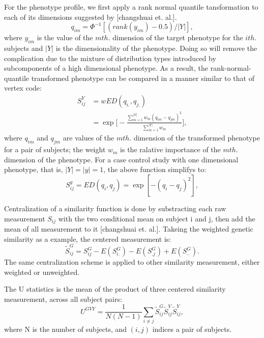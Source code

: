 \documentclass[twocolumn]{article}
\begin{document}
For the phenotype profile, we first apply a rank normal quantile tansformation to each of its dimensions suggested by [changshuai et. al.]. 
\begin{displaymath}
  q_{im}=\Phi^{-1}[(rank(y_{im})-0.5)/|Y|],
\end{displaymath} 
where $y_{im}$ is the value of the $m th.$ dimension of the target phenotype for the $i th.$ subjects and $|Y|$ is the dimensionality of the phenotype. Doing so will remove the complication due to the mixture of distribution types introduced by subcomponents of a high dimensional phenotype. As a result, the rank-normal-quantile transformed phenotype can be compared in a manner similar to that of vertex code:
\begin{equation} \label{eq_wSY}
\begin{split}
  S_{ij}^Y &= wED(q_{i.},q_{j.}) \\
  &=\exp
  {
    \Big[-\frac{\sum_{m=1}^{|Y|}{w_m(q_{im}-q_{jm})^2}} {\sum_{m=1}^{|Y|}{w_m}}\Big]
  },
\end{split}
\end{equation}
where $q_{im}$ and $q_{jm}$ are values of the $m th.$ dimension of the transformed phenotype for a pair of subjects; the weight $w_m$ is the ralative importance of the $m th.$ dimension of the phenotype. For a case control study with one dimensional phenotype, that is, $|Y|=|y|=1$, the above function simplifys to:
\begin{displaymath}
  S_{ij}^{y}=ED(q_i,q_j)=\exp{[-(q_i-q_j)^2]},
\end{displaymath}

Centralization of a similarity function is done by substracting each raw measurement $S_{ij}$ with the two conditional mean on subject i and j, then add the mean of all measurement to it [changshuai et. al.]. Takeing the weighted genetic similarity as a example, the centered measurement is:
\begin{displaymath}
  \tilde{S}_{ij}^{G}=S_{ij}^{G}-E(S_{i.}^{G})-E(S_{.j}^{G})+E(S_{..}^{G}).
\end{displaymath}
The same centralization scheme is applied to other similarity measurement, either weighted or unweighted.

The U statistics is the mean of the product of three centered similarity measurement, across all subject pairs:
\begin{displaymath}
  U^{GVY}=\frac{1}{N(N-1)}\sum_{i \neq j} \tilde{S}_{ij}^{G} \tilde{S}_{ij}^{V} \tilde{S}_{ij}^{Y},
\end{displaymath}
where N is the number of subjects, and $(i,j)$ indices a pair of subjects. 
\end{document}
